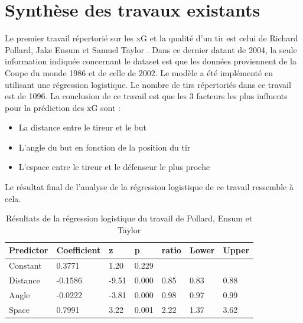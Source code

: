 \documentclass[12pt]{article}
\begin{document}
\newpage
\section{Synthèse des travaux existants}
\label{sec:synthese}
Le premier travail répertorié sur les xG et la qualité d'un tir est celui de Richard Pollard, Jake Ensum et Samuel Taylor \cite{pollardEstimatingProbabilityShot2004}.
Dans ce dernier datant de 2004, la seule information indiquée concernant le dataset est que les données proviennent de la Coupe du monde 1986 et de celle de 2002.
Le modèle a été implémenté en utilisant une régression logistique.
Le nombre de tirs répertoriés dans ce travail est de 1096.
La conclusion de ce travail est que les 3 facteurs les plus influents pour la prédiction des xG sont :
\begin{itemize}
    \item La distance entre le tireur et le but
    \item L'angle du but en fonction de la position du tir
    \item L'espace entre le tireur et le défenseur le plus proche
\end{itemize}
Le résultat final de l'analyse de la régression logistique de ce travail ressemble à cela.
\begin{table}[htp]
    \centering
    \begin{tabular}{|l|l|l|l|l|l|l|}
        \hline
        \textbf{Predictor} & \textbf{Coefficient} & \textbf{z} & \textbf{p} & \textbf{ratio} & \textbf{Lower} & \textbf{Upper} \\ \hline
        Constant           & 0.3771               & 1.20       & 0.229      &                &                &                \\ \hline
        Distance           & -0.1586              & -9.51      & 0.000      & 0.85           & 0.83           & 0.88           \\ \hline
        Angle              & -0.0222              & -3.81      & 0.000      & 0.98           & 0.97           & 0.99           \\ \hline
        Space              & 0.7991               & 3.22       & 0.001      & 2.22           & 1.37           & 3.62           \\ \hline
    \end{tabular}
    \caption{Résultats de la régression logistique du travail de Pollard, Ensum et Taylor}
\end{table}
\end{document}
